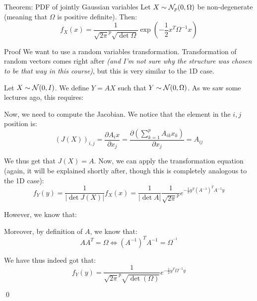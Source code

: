 \documentclass[a4paper]{article}
\begin{document}
\begin{parag}{Theorem: PDF of jointly Gaussian variables}
    Let $X \followsdistr \mathcal{N}_p\left(0, \Omega\right)$ be non-degenerate (meaning that $\Omega$ is positive definite). Then: 
    \[f_X\left(x\right) = \frac{1}{\sqrt{2\pi}^p \sqrt{\det \Omega}} \exp\left(-\frac{1}{2} x^T \Omega^{-1} x\right)\]
    
    \begin{subparag}{Proof}
        We want to use a random variables transformation. Transformation of random vectors comes right after \textit{(and I'm not sure why the structure was chosen to be that way in this course)}, but this is very similar to the 1D case.

        Let $X \followsdistr \mathcal{N}\left(0, I\right)$. We define $Y = AX$ such that $Y \followsdistr \mathcal{N}\left(0, \Omega\right)$. As we saw some lectures ago, this requires: 

        Now, we need to compute the Jacobian. We notice that the element in the $i, j$ position is: 
        \[\left(J\left(X\right)\right)_{i, j} = \frac{\partial A_i x}{\partial x_j}  = \frac{\partial \left(\sum_{k=1}^{p} A_{ik} x_k\right)}{\partial x_j} = A_{ij}\]
        
        We thus get that $J\left(X\right) = A$. Now, we can apply the transformation equation (again, it will be explained shortly after, though this is completely analogous to the 1D case):
        \[f_Y\left(y\right) = \frac{1}{\left|\det J\left(X\right)\right|} f_X\left(x\right) = \frac{1}{\left|\det A\right|} \frac{1}{\sqrt{2\pi}^p} e^{-\frac{1}{2} y^T \left(A^{-1}\right)^T A^{-1} y}\]

        However, we know that: 
        
        Moreover, by definition of $A$, we know that:
        \[A A^T = \Omega \iff \left(A^{-1}\right)^T A^{-1} = \Omega^{^{-1}}\]

        We have thus indeed got that: 
        \[f_Y\left(y\right) = \frac{1}{\sqrt{2\pi}^p \sqrt{\det\left(\Omega\right)}} e^{-\frac{1}{2} y^T \Omega^{-1} y}\]

        \qed
    \end{subparag}
\end{parag}
\end{document}
